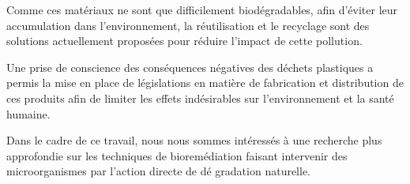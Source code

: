 \par{
Comme ces mat\'eriaux ne sont que difficilement biod\'egradables, afin d'\'eviter leur accumulation dans l'environnement, la r\'eutilisation et le recyclage sont des solutions actuellement propos\'ees pour r\'eduire l'impact de cette pollution. 
}\\
\par{
Une prise de conscience des cons\'equences n\'egatives des d\'echets plastiques a permis la mise en place de  l\'egislations en mati\`ere de fabrication et distribution de ces produits afin de limiter les effets ind\'esirables sur l'environnement et la sant\'e humaine.
}\\
\par{
Dans le cadre de ce travail, nous nous sommes int\'eress\'es \`a une recherche plus approfondie sur les techniques de biorem\'ediation faisant intervenir des microorganismes par l'action directe de d\'e
gradation naturelle. 
}
